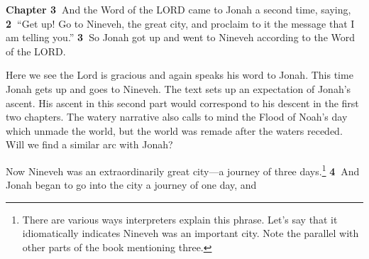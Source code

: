 \documentclass[
]{article}
\newcommand{\RL}[1]{\beginR #1\endR}
\begin{document}
\textbf{Chapter 3~}And the Word of the LORD came to Jonah a second time,
saying, \textbf{2~}\RL{``}Get up! Go to Nineveh, the great city, and
proclaim to it the message that I am telling you.'' \textbf{3~}So Jonah
got up and went to Nineveh according to the Word of the LORD.

Here we see the Lord is gracious and again speaks his word to Jonah.
This time Jonah gets up and goes to Nineveh. The text sets up an
expectation of Jonah's ascent. His ascent in this second part would
correspond to his descent in the first two chapters. The watery
narrative also calls to mind the Flood of Noah's day which unmade the
world, but the world was remade after the waters receded. Will we find a
similar arc with Jonah?

Now Nineveh was an extraordinarily great city---a journey of three
days.\footnote{There are various ways interpreters explain this phrase.
  Let's say that it idiomatically indicates Nineveh was an important
  city. Note the parallel with other parts of the book mentioning three.}
\textbf{4~}And Jonah began to go into the city a journey of one day, and
\end{document}
